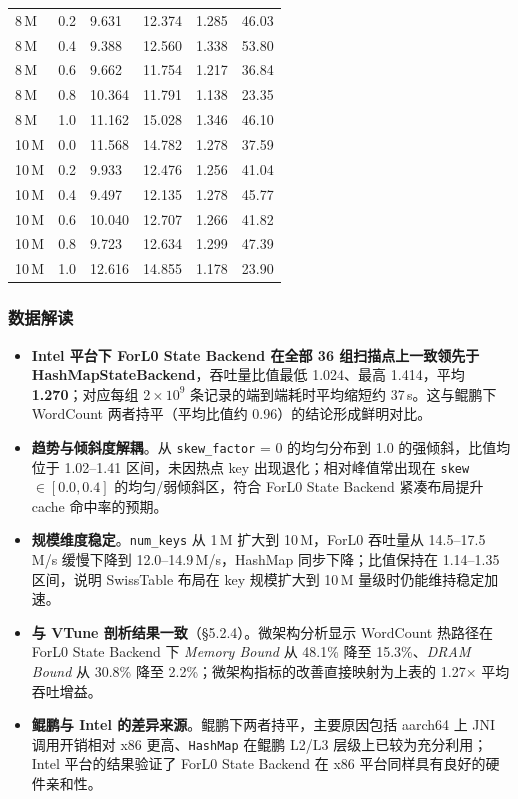 \documentclass[a4paper,11pt]{article}
\newcommand{\project}{ForL0 State Backend}
\begin{document}
\begin{table}[H]
\begin{tabularx}{\textwidth}{C{1.6cm} C{1.2cm} R{2.2cm} R{2.2cm} R{1.8cm} R{1.8cm}}
8\,M  & 0.2 & 9.631  & 12.374 & 1.285 & 46.03 \\
8\,M  & 0.4 & 9.388  & 12.560 & 1.338 & 53.80 \\
8\,M  & 0.6 & 9.662  & 11.754 & 1.217 & 36.84 \\
8\,M  & 0.8 & 10.364 & 11.791 & 1.138 & 23.35 \\
8\,M  & 1.0 & 11.162 & 15.028 & 1.346 & 46.10 \\
\,M & 0.0 & 11.568 & 14.782 & 1.278 & 37.59 \\
10\,M & 0.2 & 9.933  & 12.476 & 1.256 & 41.04 \\
10\,M & 0.4 & 9.497  & 12.135 & 1.278 & 45.77 \\
10\,M & 0.6 & 10.040 & 12.707 & 1.266 & 41.82 \\
10\,M & 0.8 & 9.723  & 12.634 & 1.299 & 47.39 \\
10\,M & 1.0 & 12.616 & 14.855 & 1.178 & 23.90 \\
\bottomrule
\end{tabularx}
\end{table}

\subsubsection{数据解读}

\begin{itemize}
  \item \textbf{Intel 平台下 \project{} 在全部 36 组扫描点上一致领先于 HashMapStateBackend}，吞吐量比值最低 1.024、最高 1.414，平均 \textbf{1.270}；对应每组 2\,$\times\,10^9$ 条记录的端到端耗时平均缩短约 37\,s。这与鲲鹏下 WordCount 两者持平（平均比值约 0.96）的结论形成鲜明对比。
  \item \textbf{趋势与倾斜度解耦}。从 \texttt{skew\_factor} = 0 的均匀分布到 1.0 的强倾斜，比值均位于 1.02--1.41 区间，未因热点 key 出现退化；相对峰值常出现在 \texttt{skew} $\in [0.0, 0.4]$ 的均匀/弱倾斜区，符合 \project{} 紧凑布局提升 cache 命中率的预期。
  \item \textbf{规模维度稳定}。\texttt{num\_keys} 从 1\,M 扩大到 10\,M，ForL0 吞吐量从 14.5--17.5\,M/s 缓慢下降到 12.0--14.9\,M/s，HashMap 同步下降；比值保持在 1.14--1.35 区间，说明 SwissTable 布局在 key 规模扩大到 10\,M 量级时仍能维持稳定加速。
  \item \textbf{与 VTune 剖析结果一致}（\S5.2.4）。微架构分析显示 WordCount 热路径在 \project{} 下 \emph{Memory Bound} 从 48.1\% 降至 15.3\%、\emph{DRAM Bound} 从 30.8\% 降至 2.2\%；微架构指标的改善直接映射为上表的 1.27$\times$ 平均吞吐增益。
  \item \textbf{鲲鹏与 Intel 的差异来源}。鲲鹏下两者持平，主要原因包括 aarch64 上 JNI 调用开销相对 x86 更高、\texttt{HashMap} 在鲲鹏 L2/L3 层级上已较为充分利用；Intel 平台的结果验证了 \project{} 在 x86 平台同样具有良好的硬件亲和性。
\end{itemize}
\end{document}
